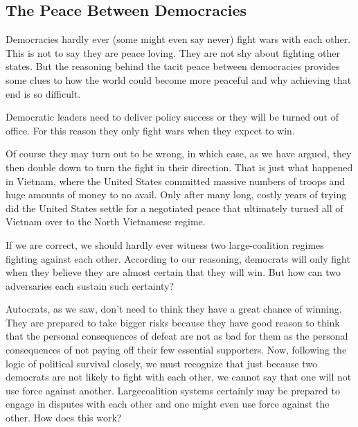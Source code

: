 \documentclass[10pt]{article}
\begin{document}
\subsection{The Peace Between Democracies}

{\large Democracies hardly ever (some might even say never) fight wars with each
other. This is not to say they are peace loving. They are not shy about fighting
other states. But the reasoning behind the tacit peace between democracies
provides some clues to how the world could become more peaceful and why achieving
that end is so difficult.}

{\large Democratic leaders need to deliver policy success or they will be turned
out of office. For this reason they only fight wars when they expect to win.}

{\large Of course they may turn out to be wrong, in which case, as we have
argued, they then double down to turn the fight in their direction. That is just
what happened in Vietnam, where the United States committed massive numbers of
troops and huge amounts of money to no avail. Only after many long, costly years
of trying did the United States settle for a negotiated peace that ultimately
turned all of Vietnam over to the North Vietnamese regime.}

{\large If we are correct, we should hardly ever witness two large-coalition
regimes fighting against each other. According to our reasoning, democrats will
only fight when they believe they are almost certain that they will win. But how
can two adversaries each sustain such certainty?}

{\large Autocrats, as we saw, don't need to think they have a great chance of
winning. They are prepared to take bigger risks because they have good reason to
think that the personal consequences of defeat are not as bad for them as the
personal consequences of not paying off their few essential supporters. Now,
following the logic of political survival closely, we must recognize that just
because two democrats are not likely to fight with each other, we cannot say that
one will not use force against another. Largecoalition systems certainly may be
prepared to engage in disputes with each other and one might even use force
against the other. How does this work?}
\end{document}
